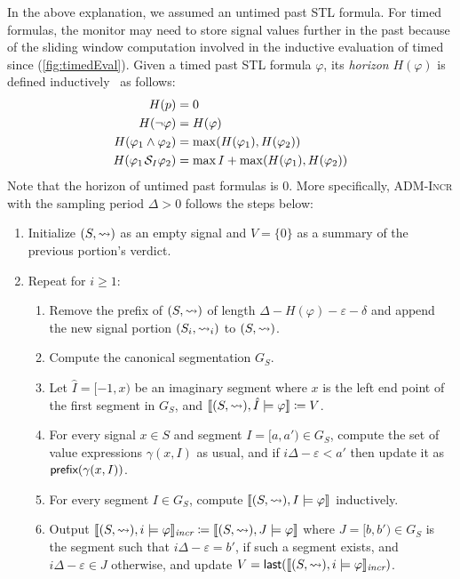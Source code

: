 In the above explanation, we assumed an untimed past STL formula.
For timed formulas, the monitor may need to store signal values further in the past because of the sliding window computation involved in the inductive evaluation of timed since (\cref{fig:timedEval}).
Given a timed past STL formula $\varphi$, its \emph{horizon} $H(\varphi)$ is defined inductively~\cite{MalerNP07,JaksicBGKNN15} as follows:
\begin{align*}
	H(p) &= 0 \\
	H(\lnot \varphi) &= H(\varphi) \\
	H(\varphi_1 \land \varphi_2) &= \max(H(\varphi_1), H(\varphi_2))\\
	H(\varphi_1 \kern.1em\mathcal{S}_I \varphi_2) &= \max I + \max(H(\varphi_1), H(\varphi_2))
\end{align*}
Note that the horizon of untimed past formulas is 0.
More specifically, \textsc{ADM-Incr} with the sampling period $\Delta > 0$ follows the steps below:
\begin{enumerate}[label*=\arabic*.]
	\item Initialize $(S,{\rightsquigarrow})$ as an empty signal and $V = \{0\}$ as a summary of the previous portion's verdict.
	\item Repeat for $i \geq 1$:
	\begin{enumerate}[leftmargin=5pt,label*=\arabic*]
		\item Remove the prefix of $(S,{\rightsquigarrow})$ of length $\Delta - H(\varphi) - \varepsilon - \delta$  and append the new signal portion $(S_i,{\rightsquigarrow}_i)$ to $(S,{\rightsquigarrow})$.
		\item Compute the canonical segmentation $G_S$.
		\item Let $\hat{I} = [-1, x)$ be an imaginary segment where $x$ is the left end point of the first segment in $G_S$, and $\llbracket (S, {\rightsquigarrow}), \hat{I} \models \varphi \rrbracket \coloneqq V$.
		\item For every signal $x \in S$ and segment $I = [a, a') \in G_S$, compute the set of value expressions $\gamma(x,I)$ as usual, and if $i\Delta - \varepsilon < a'$ then update it as $\textsf{prefix}(\gamma(x,I))$.
		\item For every segment $I \in G_S$, compute $\llbracket (S, {\rightsquigarrow}), I \models \varphi \rrbracket$ inductively.
		\item Output $\llbracket (S, {\rightsquigarrow}), i \models \varphi \rrbracket_{\textit{incr}} \coloneqq \llbracket (S, {\rightsquigarrow}), J \models \varphi \rrbracket$ where $J = [b,b') \in G_S$ is the segment such that $i\Delta - \varepsilon = b'$, if such a segment exists, and $i\Delta - \varepsilon \in J$ otherwise, and update $V = \textsf{last}(\llbracket (S, {\rightsquigarrow}), i \models \varphi \rrbracket_{\textit{incr}})$.
	\end{enumerate}
\end{enumerate}

